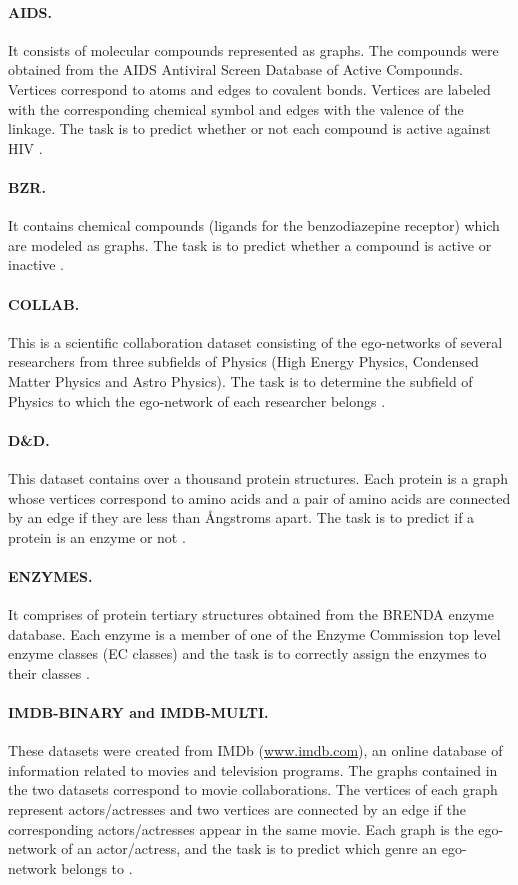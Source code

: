 \documentclass[twoside,11pt]{article}
\begin{document}
\paragraph{AIDS.} It consists of molecular compounds represented as graphs.
The compounds were obtained from the AIDS Antiviral Screen Database of Active Compounds.
Vertices correspond to atoms and edges to covalent bonds.
Vertices are labeled with the corresponding chemical symbol and edges with the valence of the linkage.
The task is to predict whether or not each compound is active against HIV \cite{riesen2008iam}.
\paragraph{BZR.} It contains  chemical compounds (ligands for the benzodiazepine receptor) which are modeled as graphs.
The task is to predict whether a compound is active or inactive \cite{sutherland2003spline}.
\paragraph{COLLAB.} This is a scientific collaboration dataset consisting of the ego-networks of several researchers from three subfields of Physics (High Energy Physics, Condensed Matter Physics and Astro Physics).
The task is to determine the subfield of Physics to which the ego-network of each researcher belongs \cite{yanardag2015deep}. 
\paragraph{D\&D.} This dataset contains over a thousand protein structures.
Each protein is a graph whose vertices correspond to amino acids and a pair of amino acids are connected by an edge if they are less than  \AA ngstroms apart.
The task is to predict if a protein is an enzyme or not \cite{dobson2003distinguishing}.
\paragraph{ENZYMES.} It comprises of  protein tertiary structures obtained from the BRENDA enzyme database.
Each enzyme is a member of one of the Enzyme Commission top level enzyme classes (EC classes) and the task is to correctly assign the enzymes to their classes \cite{borgwardt2005protein}.
\paragraph{IMDB-BINARY and IMDB-MULTI.} These datasets were created from IMDb (\url{www.imdb.com}), an online database of information related to movies and television programs. 
The graphs contained in the two datasets correspond to movie collaborations.
The vertices of each graph represent actors/actresses and two vertices are connected by an edge if the corresponding actors/actresses appear in the same movie.
Each graph is the ego-network of an actor/actress, and the task is to predict which genre an ego-network belongs to \cite{yanardag2015deep}.
\end{document}

